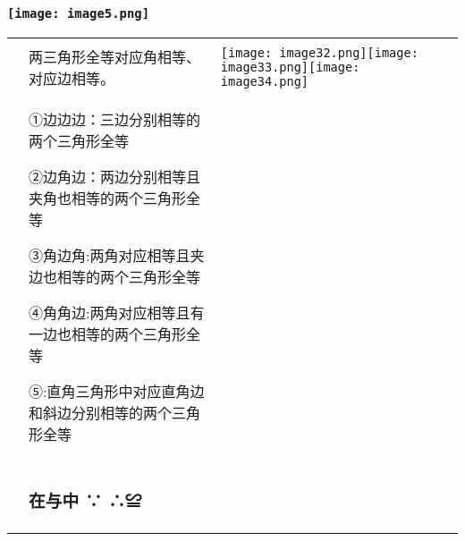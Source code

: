 \hypertarget{section}{%
\subsubsection{}\label{section}}

\hypertarget{ux5b66ux79d1ux7f51www.zxxk.com--ux6559ux80b2ux8d44ux6e90ux95e8ux6237ux63d0ux4f9bux8bd5ux9898ux8bd5ux5377ux6559ux6848ux8bfeux4ef6ux6559ux5b66ux8bbaux6587ux7d20ux6750ux7b49ux5404ux7c7bux6559ux5b66ux8d44ux6e90ux5e93ux4e0bux8f7dux8fd8ux6709ux5927ux91cfux4e30ux5bccux7684ux6559ux5b66ux8d44ux8baf-10}{%
\subsubsection{\texorpdfstring{\protect\texttt{[image: image5.png]}}{学科网(www.zxxk.com)-\/-教育资源门户，提供试题试卷、教案、课件、教学论文、素材等各类教学资源库下载，还有大量丰富的教学资讯！}}\label{ux5b66ux79d1ux7f51www.zxxk.com--ux6559ux80b2ux8d44ux6e90ux95e8ux6237ux63d0ux4f9bux8bd5ux9898ux8bd5ux5377ux6559ux6848ux8bfeux4ef6ux6559ux5b66ux8bbaux6587ux7d20ux6750ux7b49ux5404ux7c7bux6559ux5b66ux8d44ux6e90ux5e93ux4e0bux8f7dux8fd8ux6709ux5927ux91cfux4e30ux5bccux7684ux6559ux5b66ux8d44ux8baf-10}}

\begin{longtable}[]{@{}lll@{}}
\toprule
\endhead
& &\tabularnewline
& 两三角形全等对应角相等、对应边相等。 &
\texttt{[image: image32.png]}\texttt{[image: image33.png]}\texttt{[image: image34.png]}\tabularnewline
\begin{minipage}[t]{0.30\columnwidth}\raggedright
\strut
\end{minipage} & \begin{minipage}[t]{0.30\columnwidth}\raggedright
①边边边：三边分别相等的两个三角形全等

②边角边：两边分别相等且夹角也相等的两个三角形全等

③角边角:两角对应相等且夹边也相等的两个三角形全等

④角角边:两角对应相等且有一边也相等的两个三角形全等

⑤:直角三角形中对应直角边和斜边分别相等的两个三角形全等\strut
\end{minipage} & \begin{minipage}[t]{0.30\columnwidth}\raggedright
\strut
\end{minipage}\tabularnewline
\begin{minipage}[t]{0.30\columnwidth}\raggedright
\strut
\end{minipage} & \begin{minipage}[t]{0.30\columnwidth}\raggedright
\hypertarget{ux5728ux4e0eux4e2d}{%
\subsubsection{在与中 ∵ ∴≌}\label{ux5728ux4e0eux4e2d}}\strut
\end{minipage} & \begin{minipage}[t]{0.30\columnwidth}\raggedright
\strut
\end{minipage}\tabularnewline
\bottomrule
\end{longtable}

